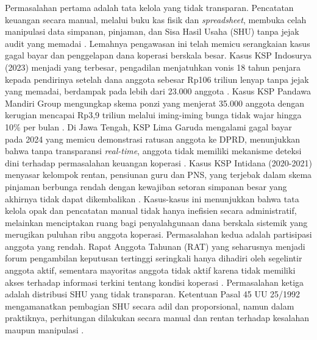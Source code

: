 \medskip
Permasalahan pertama adalah tata kelola yang tidak transparan. Pencatatan keuangan secara manual, melalui buku kas fisik dan \textit{spreadsheet}, membuka celah manipulasi data simpanan, pinjaman, dan Sisa Hasil Usaha (SHU) tanpa jejak audit yang memadai \cite{kartika2024tanggung}. Lemahnya pengawasan ini telah memicu serangkaian kasus gagal bayar dan penggelapan dana koperasi berskala besar. Kasus KSP Indosurya (2023) menjadi yang terbesar, pengadilan menjatuhkan vonis 18 tahun penjara kepada pendirinya setelah dana anggota sebesar Rp106 triliun lenyap tanpa jejak yang memadai, berdampak pada lebih dari 23.000 anggota \cite{indosurya2023}. Kasus KSP Pandawa Mandiri Group mengungkap skema ponzi yang menjerat 35.000 anggota dengan kerugian mencapai Rp3,9 triliun melalui iming-iming bunga tidak wajar hingga 10\% per bulan \cite{pandawa2023}. Di Jawa Tengah, KSP Lima Garuda mengalami gagal bayar pada 2024 yang memicu demonstrasi ratusan anggota ke DPRD, menunjukkan bahwa tanpa transparansi \textit{real-time}, anggota tidak memiliki mekanisme deteksi dini terhadap permasalahan keuangan koperasi \cite{lima2024}. Kasus KSP Intidana (2020-2021) menyasar kelompok rentan, pensiunan guru dan PNS, yang terjebak dalam skema pinjaman berbunga rendah dengan kewajiban setoran simpanan besar yang akhirnya tidak dapat dikembalikan \cite{intidana2021}. Kasus-kasus ini menunjukkan bahwa tata kelola opak dan pencatatan manual tidak hanya inefisien secara administratif, melainkan menciptakan ruang bagi penyalahgunaan dana berskala sistemik yang merugikan puluhan ribu anggota koperasi. Permasalahan kedua adalah partisipasi anggota yang rendah. Rapat Anggota Tahunan (RAT) yang seharusnya menjadi forum pengambilan keputusan tertinggi seringkali hanya dihadiri oleh segelintir anggota aktif, sementara mayoritas anggota tidak aktif karena tidak memiliki akses terhadap informasi terkini tentang kondisi koperasi \cite{novatiani2023pengaruh}. Permasalahan ketiga adalah distribusi SHU yang tidak transparan. Ketentuan Pasal 45 UU 25/1992 mengamanatkan pembagian SHU secara adil dan proporsional, namun dalam praktiknya, perhitungan dilakukan secara manual dan rentan terhadap kesalahan maupun manipulasi \cite{sailana2023pengaruh}.

